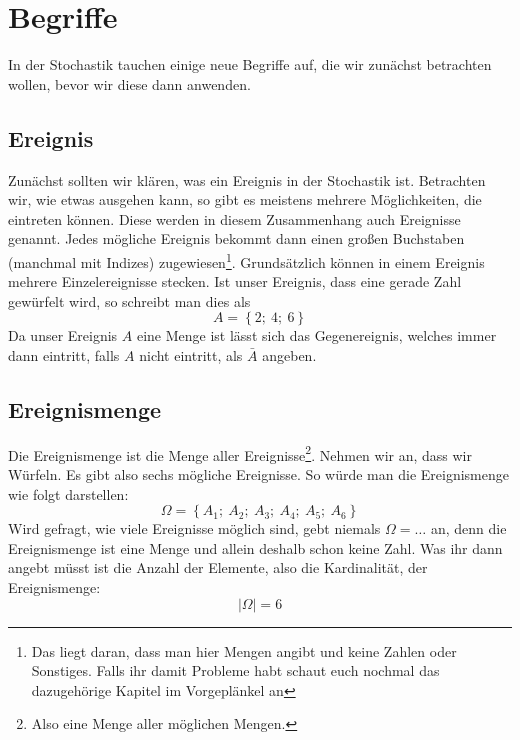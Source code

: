 \section{Begriffe}
	In der Stochastik tauchen einige neue Begriffe auf, die wir zunächst betrachten
	wollen, bevor wir diese dann anwenden.

	\subsection{Ereignis}
		Zunächst sollten wir klären, was ein Ereignis in der Stochastik ist.
		Betrachten wir, wie etwas ausgehen kann, so gibt es meistens mehrere
		Möglichkeiten, die eintreten können. Diese werden in diesem Zusammenhang auch
		Ereignisse genannt. Jedes mögliche Ereignis bekommt dann einen großen
		Buchstaben (manchmal mit Indizes) zugewiesen\footnote{Das liegt daran, dass
		man hier Mengen angibt und keine Zahlen oder Sonstiges. Falls ihr damit
		Probleme habt schaut euch nochmal das dazugehörige Kapitel im Vorgeplänkel
		an}. Grundsätzlich können in einem Ereignis mehrere Einzelereignisse stecken.
		Ist unser Ereignis, dass eine gerade Zahl gewürfelt wird, so schreibt man dies
		als
		\[A=\left\lbrace 2;\ 4;\ 6\right\rbrace \]
		Da unser Ereignis \(A\) eine Menge ist lässt sich das Gegenereignis, welches
		immer dann eintritt, falls \(A\) nicht eintritt, als \(\bar{A}\) angeben.

	\subsection{Ereignismenge}
		Die Ereignismenge ist die Menge aller Ereignisse\footnote{Also eine Menge
		aller möglichen Mengen.}. Nehmen wir an, dass wir Würfeln. Es gibt also sechs
		mögliche Ereignisse. So würde man die Ereignismenge wie folgt darstellen:
		\[\Omega=\left\lbrace A_1;\ A_2;\ A_3;\ A_4;\ A_5;\ A_6\right\rbrace \]
		Wird gefragt, wie viele Ereignisse möglich sind, gebt niemals
		\(\Omega=\ldots\) an, denn die Ereignismenge ist eine Menge und allein deshalb
		schon keine Zahl. Was ihr dann angebt müsst ist die Anzahl der Elemente, also
		die Kardinalität, der Ereignismenge:
		\[| \Omega |=6\]

